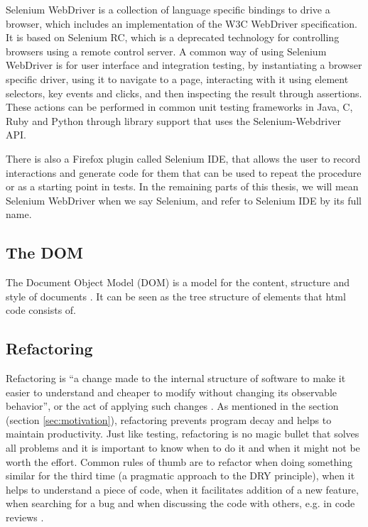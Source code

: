 \documentclass[11pt]{article}
\begin{document}
Selenium WebDriver is a collection of language specific bindings to drive a browser, which includes an implementation of the W3C WebDriver specification. It is based on Selenium RC, which is a deprecated technology for controlling browsers using a remote control server. A common way of using Selenium WebDriver is for user interface and integration testing, by instantiating a browser specific driver, using it to navigate to a page, interacting with it using element selectors, key events and clicks, and then inspecting the result through assertions. These actions can be performed in common unit testing frameworks in Java, C\nolinebreak\hspace{-.05em}\raisebox{.3ex}{\scriptsize\bf \#}, Ruby and Python through library support that uses the Selenium-Webdriver API. \cite{Selenium}

There is also a Firefox plugin called Selenium IDE, that allows the user to record interactions and generate code for them that can be used to repeat the procedure or as a starting point in tests. In the remaining parts of this thesis, we will mean Selenium WebDriver when we say Selenium, and refer to Selenium IDE by its full name.

\subsection{The DOM}
\label{sec:dom}

The Document Object Model (DOM) is a model for the content, structure and style of documents \cite{W3CDOM}. It can be seen as the tree structure of elements that html code consists of.

\subsection{Refactoring}
\label{sec:refactor}

Refactoring is ``a change made to the internal structure of software to make it easier to understand and cheaper to modify without changing its observable behavior'', or the act of applying such changes \cite[p.~46]{Refactoring}. As mentioned in the  section (section \ref{sec:motivation}), refactoring prevents program decay and helps to maintain productivity. Just like testing, refactoring is no magic bullet that solves all problems and it is important to know when to do it and when it might not be worth the effort. Common rules of thumb are to refactor when doing something similar for the third time (a pragmatic approach to the DRY principle), when it helps to understand a piece of code, when it facilitates addition of a new feature, when searching for a bug and when discussing the code with others, e.g. in code reviews \cite[p.~49-51]{Refactoring}.
\end{document}
